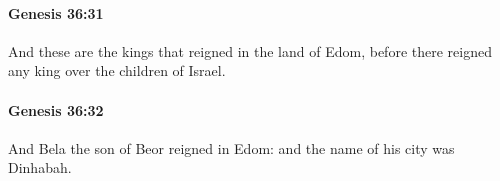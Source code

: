 		\paragraph{Genesis 36:31} %
			\label{GENESIS-36-31}

			And these are the kings that reigned in the land of Edom, before there reigned any king over the children of Israel.


		\paragraph{Genesis 36:32} %
			\label{GENESIS-36-32}

			And Bela the son of Beor reigned in Edom: and the name of his city was Dinhabah.


